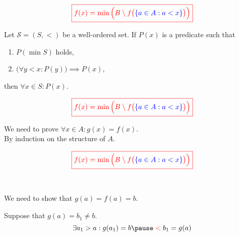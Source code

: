 \begin{frame}{}
  \[
    \textcolor{red}{\boxed{f(x) = \min \Big(B \setminus f\big(\textcolor{blue}{\{a \in A: a < x\}}\big)\Big)}}
  \]
  
  \pause
  
  \pause
  \begin{theorem}
    Let $\mathcal{S} = (S, <)$ be a well-ordered set.
    If $P(x)$ is a predicate such that
    \begin{enumerate}
      \item $P(\min S)$ holds,
      \item $\big(\forall y < x: P(y)\big) \implies P(x)$,
    \end{enumerate}
    then $\forall x \in S: P(x)$.
  \end{theorem}
  
\end{frame}

\begin{frame}{}
  \[
    \textcolor{red}{\boxed{f(x) = \min \Big(B \setminus f\big(\textcolor{blue}{\{a \in A: a < x\}}\big)\Big)}}
  \]
  
  \vspace{0.50cm}
  \begin{center}
    We need to prove $\forall x \in A: g(x) = f(x)$. \\[15pt]
    By induction on the structure of $A$.
  \end{center}
\end{frame}

\begin{frame}{}
  \[
    \textcolor{red}{\boxed{f(x) = \min \Big(B \setminus f\big(\textcolor{blue}{\{a \in A: a < x\}}\big)\Big)}}
  \]
  
  \begin{center}
     \\[8pt] \pause
    
    We need to show that $g(a) = f(a) = b.$ \\[20pt] \pause
    
    Suppose  that $g(a) = b_1 \neq b$.
    \pause
    \[
      \exists a_1 > a: g(a_1) = b \pause \;\red{<}\; b_1 = g(a)
    \]
  \end{center}
\end{frame}


